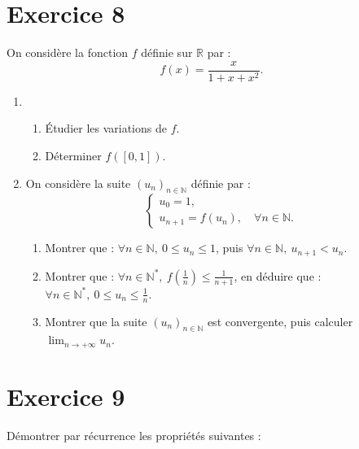 \documentclass[a4paper,11pt]{article}
\begin{document}
\section*{Exercice 8}

On considère la fonction \(f\) définie sur \(\mathbb{R}\) par :
\[
f(x) = \frac{x}{1 + x + x^2}.
\]

\begin{enumerate}
    \item 
    \begin{enumerate}
        \item Étudier les variations de \(f\).
        \item Déterminer \(f([0,1])\).
    \end{enumerate}
    \item On considère la suite \((u_n)_{n \in \mathbb{N}}\) définie par :
    \[
    \begin{cases}
    u_0 = 1, \\
    u_{n+1} = f(u_n), \quad \forall n \in \mathbb{N}.
    \end{cases}
    \]
    \begin{enumerate}
        \item Montrer que : \(\forall n \in \mathbb{N}, \ 0 \leq u_n \leq 1\), puis \(\forall n \in \mathbb{N}, \ u_{n+1} < u_n\).
        \item Montrer que : \(\forall n \in \mathbb{N}^*, \ f\left(\frac{1}{n}\right) \leq \frac{1}{n+1}\), en déduire que : \(\forall n \in \mathbb{N}^*, \ 0 \leq u_n \leq \frac{1}{n}\).
        \item Montrer que la suite \((u_n)_{n \in \mathbb{N}}\) est convergente, puis calculer \(\lim_{n \to +\infty} u_n\).
    \end{enumerate}
\end{enumerate}

\section*{Exercice 9}

Démontrer par récurrence les propriétés suivantes :
\end{document}
